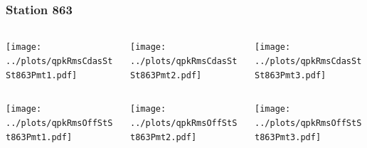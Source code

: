 \documentclass[aspectratio=169]{beamer}
\begin{document}
\begin{frame} 
  \frametitle{Station 863}
  \begin{center}
    \begin{columns}
      \begin{column}{0.33\textwidth}
        \texttt{[image: ../plots/qpkRmsCdasStSt863Pmt1.pdf]}
      \end{column}
      \begin{column}{0.33\textwidth}
        \texttt{[image: ../plots/qpkRmsCdasStSt863Pmt2.pdf]}
      \end{column}
      \begin{column}{0.33\textwidth}
        \texttt{[image: ../plots/qpkRmsCdasStSt863Pmt3.pdf]}
      \end{column}
    \end{columns}
  \end{center}

  \begin{center}
    \begin{columns}
      \begin{column}{0.33\textwidth}
        \texttt{[image: ../plots/qpkRmsOffStSt863Pmt1.pdf]}
      \end{column}
      \begin{column}{0.33\textwidth}
        \texttt{[image: ../plots/qpkRmsOffStSt863Pmt2.pdf]}
      \end{column}
      \begin{column}{0.33\textwidth}
        \texttt{[image: ../plots/qpkRmsOffStSt863Pmt3.pdf]}
      \end{column}
    \end{columns}
  \end{center}
\end{frame}
\end{document}
